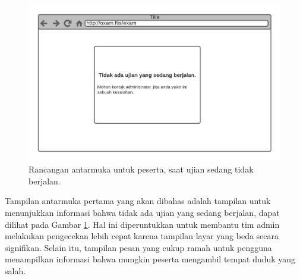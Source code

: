     \begin{figure}[H]
        \centering
        \includegraphics[width=0.7\paperwidth]{Gambar/mockups/Mockup--Peserta - Blankstate.pdf}
        \caption{Rancangan antarmuka untuk peserta, saat ujian sedang tidak berjalan.}
        \label{fig:mockup_peserta_blankstate}
    \end{figure}
     Tampilan antarmuka pertama yang akan dibahas adalah tampilan untuk
     menunjukkan informasi bahwa tidak ada ujian yang sedang berjalan, dapat
     dilihat pada Gambar \ref{fig:mockup_peserta_blankstate}. Hal ini
     diperuntukkan untuk membantu tim admin melakukan pengecekan lebih cepat
     karena tampilan layar yang beda secara signifikan. Selain itu, tampilan
     pesan yang cukup ramah untuk pengguna menampilkan informasi bahwa mungkin
     peserta mengambil tempat duduk yang salah.


